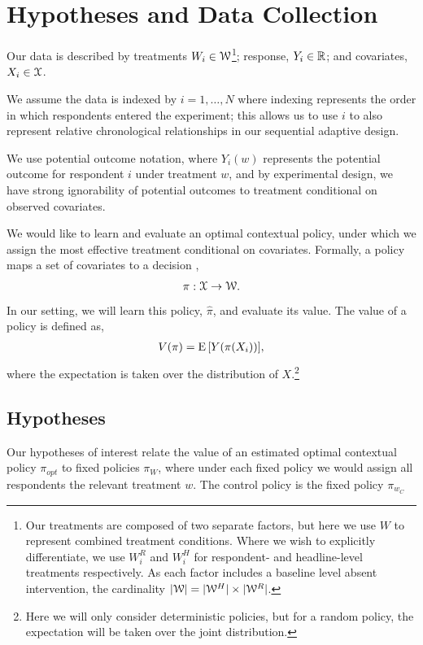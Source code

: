 \documentclass[letterpaper, 12pt, parskip=full,]{scrartcl}
\begin{document}
\section{Hypotheses and Data Collection}



Our data is described by treatments $W_i \in {\EuScript W}$\footnote{Our treatments are composed of two separate factors, but here we use $W$ to represent combined treatment conditions. Where we wish to explicitly differentiate, we use $W^R_i$ and $W^H_i$ for respondent- and headline-level treatments respectively. As each factor includes a baseline level absent intervention, the cardinality $|{\EuScript W}| = |{\EuScript W}^H|\times |{\EuScript W}^R|$.}; response,  $Y_i \in {\mathbb R}$; and covariates, $X_i \in {\EuScript X}$. 

We assume the data is indexed by $i = 1, \dots, N$ where indexing represents the order in which respondents entered the experiment; this allows us to use $i$ to also represent relative chronological relationships in our sequential adaptive design. 

We use potential outcome notation, where $Y_i(w)$ represents the potential outcome for respondent $i$ under treatment $w$, and by experimental design,  we have strong ignorability of potential outcomes to treatment conditional on observed covariates. 


We would like to learn and evaluate an optimal contextual policy, under which we assign the most effective treatment conditional on covariates. Formally, a policy maps a set of covariates to a decision \citep{athey2017efficient}, %
\begin{align}
  \pi: {\EuScript X} \rightarrow {\EuScript W}. 
  \label{eq:policy}
\end{align}
In our setting, we will learn this policy, $\hat \pi$, and evaluate its value. The value of a policy is defined as, 
\begin{align}
V(\pi) =  {\textrm E}\,[Y(\pi(X_{i}))],
  \label{eq:policy_value}
\end{align}
where the expectation is taken over the distribution of $X$.\footnote{Here we will only consider deterministic policies, but for a random policy, the expectation will be taken over the joint distribution. }

\subsection{Hypotheses}\label{hypotheses}

Our hypotheses of interest relate the value of an estimated optimal contextual policy $\pi_{opt}$ to fixed policies $\pi_{W}$, where under each fixed policy we would assign all respondents the relevant treatment $w$. The control policy is the fixed policy $\pi_{w_{C}}$
\end{document}
